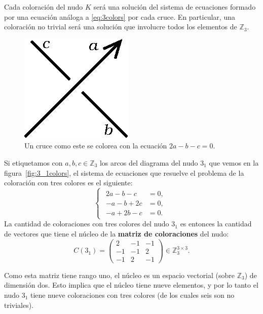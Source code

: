 \documentclass[graybox]{svmult}
\newcommand{\Z}{\mathbb{Z}}
\begin{document}
Cada coloración del nudo $K$ será una solución del sistema de ecuaciones
formado por una ecuación análoga a \eqref{eq:3colors} por cada cruce. En particular, una
coloración no trivial será una solución que involucre todos los elementos
de $\Z_3$. 

\begin{figure}[ht]
	\centering
	\includegraphics[scale=0.6]{images/crossing}
	\caption{Un cruce como este se colorea con la ecuación $2a-b-c=0$.}
	\label{fig:crossing}
\end{figure}

\begin{example}
	\label{exa:3_1:3colors}
	Si etiquetamos con $a,b,c\in\Z_3$ los arcos del diagrama del nudo $3_1$ que vemos 
	en la figura~\ref{fig:3_1colors}, el sistema
	de ecuaciones que resuelve el problema de la coloración con tres colores es el
	siguiente:
	\[
	\begin{cases}
		\begin{aligned}
			2a-b-c&=0,\\
			-a-b+2c&=0,\\
			-a+2b-c&=0.
		\end{aligned}
	\end{cases}
	\]
	La cantidad de coloraciones con tres colores del nudo $3_1$ es entonces la
	cantidad de vectores que tiene el núcleo de la \textbf{matriz de coloraciones}
	del nudo:
	\begin{equation*}
		C(3_1)=\begin{pmatrix}
		2 & -1 & -1\\
		-1 & -1 & 2\\
		-1 & 2 & -1
		\end{pmatrix}\in\Z_3^{3\times3}.
	\end{equation*}

    Como esta matriz tiene rango uno, el núcleo es un espacio vectorial (sobre
    $\Z_3$) de dimensión dos. Esto implica que el núcleo tiene nueve elementos,
    y por lo tanto el nudo $3_1$ tiene nueve coloraciones con tres colores (de los
    cuales seis son no triviales).
\end{example}
\end{document}
